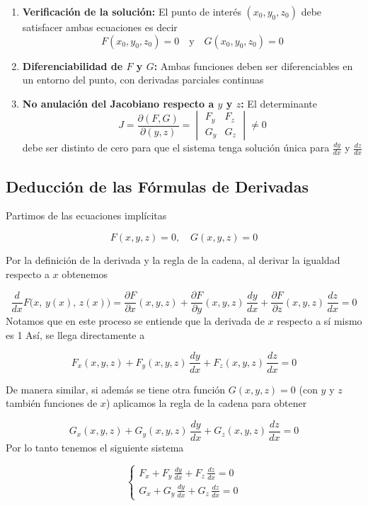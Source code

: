 \documentclass{article}
\begin{document}
\begin{enumerate}
    \item \textbf{\color{teal}Verificación de la solución:} El punto de interés \( (x_0, y_0, z_0) \) debe satisfacer ambas ecuaciones es decir
    \[
    F(x_0, y_0, z_0) = 0 \quad \text{y} \quad G(x_0, y_0, z_0) = 0
    \]
    \item \textbf{\color{teal}Diferenciabilidad de \( F \) y \( G \):} Ambas funciones deben ser diferenciables en un entorno del punto, con derivadas parciales continuas
    \item \textbf{\color{teal}No anulación del Jacobiano respecto a \( y \) y \( z \):} El determinante
    \[
    J = \frac{\partial(F,G)}{\partial(y,z)} = 
    \begin{vmatrix}
    F_y & F_z \\
    G_y & G_z
    \end{vmatrix}
    \neq 0
    \]
    debe ser distinto de cero para que el sistema tenga solución única para \( \frac{dy}{dx} \) y \( \frac{dz}{dx} \)
\end{enumerate}

\subsection*{Deducción de las Fórmulas de Derivadas}

Partimos de las ecuaciones implícitas

\[
F(x,y,z) = 0, \quad G(x,y,z) = 0
\]

Por la definición de la derivada y la regla de la cadena, al derivar la igualdad respecto a \( x \) obtenemos

\[
\frac{d}{dx}F\bigl(x,\,y(x),\,z(x)\bigr)
=\frac{\partial F}{\partial x}(x,y,z)
+\frac{\partial F}{\partial y}(x,y,z)\,\frac{dy}{dx}
+\frac{\partial F}{\partial z}(x,y,z)\,\frac{dz}{dx}=0
\]
Notamos que en este proceso se entiende que la derivada de \( x \) respecto a sí mismo es 1 Así, se llega directamente a

\[
F_x(x,y,z)+F_y(x,y,z)\,\frac{dy}{dx}+F_z(x,y,z)\,\frac{dz}{dx}=0
\]

De manera similar, si además se tiene otra función \( G(x,y,z)=0 \) (con \( y \) y \( z \) también funciones de \( x \)) aplicamos la regla de la cadena para obtener

\[
G_x(x,y,z)+G_y(x,y,z)\,\frac{dy}{dx}+G_z(x,y,z)\,\frac{dz}{dx}=0
\]
Por lo tanto tenemos el siguiente sistema

\[
\begin{cases}
F_x+F_y\,\frac{dy}{dx}+F_z\,\frac{dz}{dx}=0 \\
G_x+G_y\,\frac{dy}{dx}+G_z\,\frac{dz}{dx}=0
\end{cases}
\]
\end{document}
